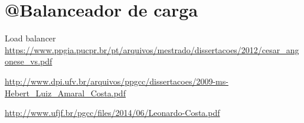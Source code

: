 \chapter{@Balanceador de carga}

Load balancer \url{https://www.ppgia.pucpr.br/pt/arquivos/mestrado/dissertacoes/2012/cesar_angonese_vs.pdf}

\url{http://www.dpi.ufv.br/arquivos/ppgcc/dissertacoes/2009-ms-Hebert_Luiz_Amaral_Costa.pdf}

\url{http://www.ufjf.br/pgcc/files/2014/06/Leonardo-Costa.pdf}

